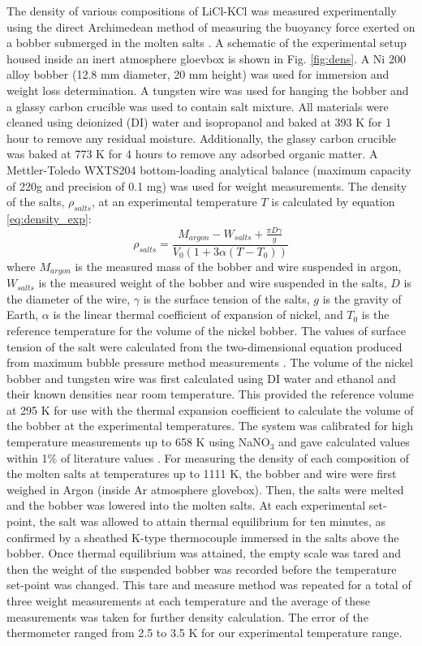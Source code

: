 \documentclass[review]{elsarticle}
\begin{document}
The density of various compositions of LiCl-KCl was measured experimentally using the direct Archimedean method of measuring the buoyancy force exerted on a bobber submerged in the molten salts \cite{Sato2009}. A schematic of the experimental setup housed inside an inert atmosphere gloevbox is shown in Fig. \ref{fig:dens}. A Ni 200 alloy bobber (12.8 mm diameter, 20 mm height) was used for immersion and weight loss determination. A tungsten wire was used for hanging the bobber and a glassy carbon crucible was used to contain salt mixture. All materials were cleaned using deionized (DI) water and isopropanol and baked at 393 K for 1 hour to remove any residual moisture. Additionally, the glassy carbon crucible was baked at 773 K for 4 hours to remove any adsorbed organic matter. A Mettler-Toledo WXTS204 bottom-loading analytical balance (maximum capacity of 220g and precision of 0.1 mg) was used for weight measurements. The density of the salts, $\rho_{salts}$, at an experimental temperature $T$ is calculated by equation \ref{eq:density_exp}:
\begin{equation}
    \label{eq:density_exp}
    \rho_{salts} = \frac{M_{argon} - W_{salts} + \frac{ \pi D\gamma}{g} }{V_0 (1 + 3\alpha(T - T_0))}
\end{equation}
where $M_{argon}$ is the measured mass of the bobber and wire suspended in argon, $W_{salts}$ is the measured weight of the bobber and wire suspended in the salts, $D$ is the diameter of the wire, $\gamma$ is the surface tension of the salts, $g$ is the gravity of Earth, $\alpha$ is the linear thermal coefficient of expansion of nickel, and $T_0$ is the reference temperature for the volume of the nickel bobber. The values of surface tension of the salt were calculated from the two-dimensional equation produced from maximum bubble pressure method measurements \cite{janz1975molten}. The volume of the nickel bobber and tungsten wire was first calculated using DI water and ethanol and their known densities near room temperature. This provided the reference volume at 295 K for use with the thermal expansion coefficient to calculate the volume of the bobber at the experimental temperatures. The system was calibrated for high temperature measurements up to 658 K using NaNO$_{3}$ and gave calculated values within 1\% of literature values \cite{Janz1972}. For measuring the density of each composition of the molten salts at temperatures up to 1111 K, the bobber and wire were first weighed in Argon (inside Ar atmosphere glovebox). Then, the salts were melted and the bobber was lowered into the molten salts. At each experimental set-point, the salt was allowed to attain thermal equilibrium for ten minutes, as confirmed by a sheathed K-type thermocouple immersed in the salts above the bobber. Once thermal equilibrium was attained, the empty scale was tared and then the weight of the suspended bobber was recorded before the temperature set-point was changed. This tare and measure method was repeated for a total of three weight measurements at each temperature and the average of these measurements was taken for further density calculation. The error of the thermometer ranged from 2.5 to 3.5 K for our experimental temperature range.
\end{document}
